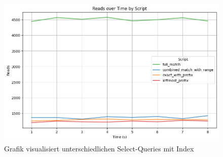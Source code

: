 \begin{figure}[H]
    \centering
    \includegraphics[width=.7\textwidth]{PNGs/Script/Index/Hash/hash-query-differences/Reads}
    \caption[Hash-Indexing: Unterschiedliche Abfragen mit Index]{Grafik visualisiert unterschiedlichen Select-Queries mit Index }
    \label{fig:hash-query-reads}
\end{figure}
